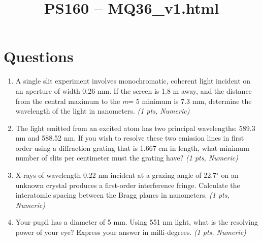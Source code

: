 \documentclass[11pt]{article}
\title{PS160 -- MQ36\_v1.html}
\date{}
\begin{document}
\maketitle

\section*{Questions}

\begin{enumerate}[leftmargin=*]
  \item A single slit experiment involves monochromatic, coherent light incident on an aperture of width 0.26 mm. If the screen is 1.8 m away, and the distance from the central maximum to the \emph{m}= 5 minimum is 7.3 mm, determine the wavelength of the light in nanometers. \hfill \textit{(1 pts, Numeric)}

  \item The light emitted from an excited atom has two principal wavelengths: 589.3 nm and 588.52 nm. If you wish to resolve these two emission lines in first order using a diffraction grating that is 1.667 cm in length, what minimum number of slits per centimeter must the grating have? \hfill \textit{(1 pts, Numeric)}

  \item X-rays of wavelength 0.22 nm incident at a grazing angle of 22.7$^{\circ}$ on an unknown crystal produces a first-order interference fringe. Calculate the interatomic spacing between the Bragg planes in nanometers. \hfill \textit{(1 pts, Numeric)}

  \item Your pupil has a diameter of 5 mm. Using 551 nm light, what is the resolving power of your eye? Express your answer in milli-degrees. \hfill \textit{(1 pts, Numeric)}

\end{enumerate}
\end{document}
